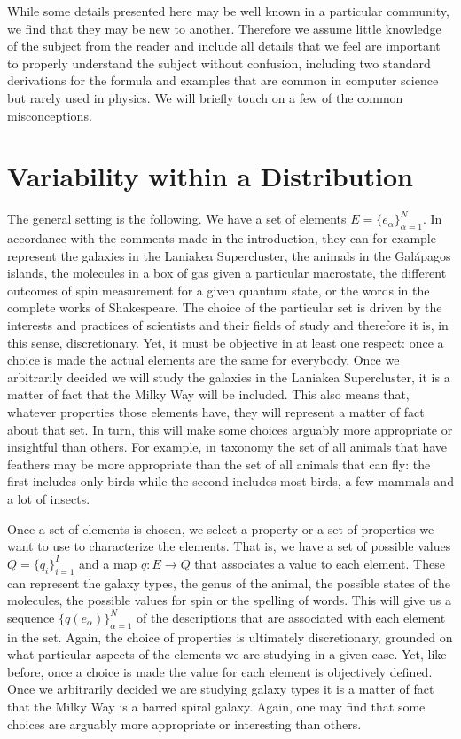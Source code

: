 \documentclass[prb, twocolumn]{revtex4-1}
\begin{document}
While some details presented here may be well known in a particular community, we find that they may be new to another. Therefore we assume little knowledge of the subject from the reader and include all details that we feel are important to properly understand the subject without confusion, including two standard derivations for the formula and examples that are common in computer science but rarely used in physics. We will briefly touch on a few of the common misconceptions.

\section{Variability within a Distribution\label{vwd}}

The general setting is the following. We have a set of elements $E = \{e_\alpha\}_{\alpha=1}^N$. In accordance with the comments made in the introduction, they can for example represent the galaxies in the Laniakea Supercluster, the animals in the Gal\'{a}pagos islands, the molecules in a box of gas given a particular macrostate, the different outcomes of spin measurement for a given quantum state, or the words in the complete works of Shakespeare. The choice of the particular set is driven by the interests and practices of scientists and their fields of study and therefore it is, in this sense, discretionary. Yet, it must be objective in at least one respect: once a choice is made the actual elements are the same for everybody. Once we arbitrarily decided we will study the galaxies in the Laniakea Supercluster, it is a matter of fact that the Milky Way will be included. This also means that, whatever properties those elements have, they will represent a matter of fact about that set. In turn, this will make some choices arguably more appropriate or insightful than others. For example, in taxonomy the set of all animals that have feathers may be more appropriate than the set of all animals that can fly: the first includes only birds while the second includes most birds, a few mammals and a lot of insects.

Once a set of elements is chosen, we select a property or a set of properties we want to use to characterize the elements. That is, we have a set of possible values $Q=\{q_i\}_{i=1}^I$ and a map $q : E \to Q$ that associates a value to each element. These can represent the galaxy types, the genus of the animal, the possible states of the molecules, the possible values for spin or the spelling of words. This will give us a sequence $\{q(e_\alpha)\}_{\alpha=1}^N$ of the descriptions that are associated with each element in the set. Again, the choice of properties is ultimately discretionary, grounded on what particular aspects of the elements we are studying in a given case. Yet, like before, once a choice is made the value for each element is objectively defined. Once we arbitrarily decided we are studying galaxy types it is a matter of fact that the Milky Way is a barred spiral galaxy. Again, one may find that some choices are arguably more appropriate or interesting than others.
\end{document}
